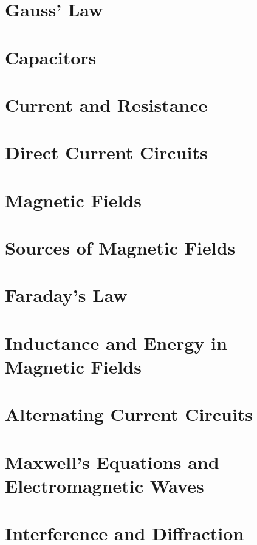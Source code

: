\section{Gauss' Law}
\section{Capacitors}
\section{Current and Resistance}
\section{Direct Current Circuits}
\section{Magnetic Fields}
\section{Sources of Magnetic Fields}
\section{Faraday's Law}
\section{Inductance and Energy in Magnetic Fields}
\section{Alternating Current Circuits}
\section{Maxwell's Equations and Electromagnetic Waves}
\section{Interference and Diffraction}


